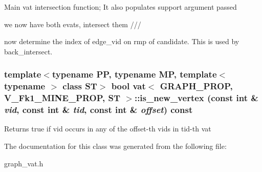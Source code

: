 Main vat intersection function; It also populates support argument passed

we now have both evats, intersect them ///

now determine the index of edge\_\-vid on rmp of candidate. This is used by back\_\-intersect. 
\subsubsection{\setlength{\rightskip}{0pt plus 5cm}template$<$typename PP, typename MP, template$<$ typename $>$ class ST$>$ bool {\bf vat}$<$ GRAPH\_\-PROP, V\_\-Fk1\_\-MINE\_\-PROP, ST $>$::is\_\-new\_\-vertex (const int \& {\em vid}, const int \& {\em tid}, const int \& {\em offset}) const\hspace{0.3cm}{\tt  [inline]}}\label{classvat_3_01GRAPH__PROP_00_01V__Fk1__MINE__PROP_00_01ST_01_4_a21}


Returns true if vid occurs in any of the offset-th vids in tid-th vat 

The documentation for this class was generated from the following file:\begin{CompactItemize}
\item 
graph\_\-vat.h\end{CompactItemize}
